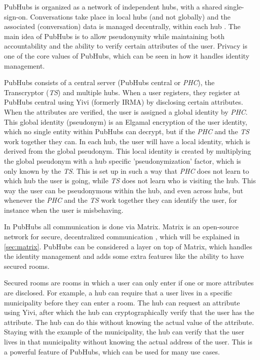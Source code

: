\documentclass{report}
\begin{document}
PubHubs is organized as a network of independent hubs, with a shared single-sign-on. Conversations take place in
local hubs (and not globally) and the associated (conversation) data is managed decentrally, within each hub
\cite{jacobs_pubhubs_2023}. The main idea of PubHubs is to allow pseudonymity while maintaining both accountability
and the ability to verify certain attributes of the user. Privacy is one of the core values of PubHubs, which can be
seen in how it handles identity management.

PubHubs consists of a central server (PubHubs central or \textit{PHC}), the Transcryptor (\textit{TS}) and multiple
hubs.
When a user registers, they register at PubHubs central using Yivi (formerly IRMA)\cite{alpar_irma_nodate} by disclosing
certain attributes. When the attributes are verified, the user is assigned a global identity by \textit{PHC}.
This global identity (pseudonym) is an Elgamal encryption of the user identity, which no single entity within PubHubs
can decrypt, but if the \textit{PHC} and the \textit{TS} work together they can. In each hub, the user will have a
local identity, which is derived from the global pseudonym. This local identity is created by multiplying the
global pseudonym with a hub specific 'pseudonymization' factor, which is only known by the \textit{TS}. This is set
up in such a way that \textit{PHC} does not learn to which hub the user is going, while \textit{TS} does not learn
who is visiting the hub. This way the user can be pseudonymous within the hub, and even across hubs, but whenever the
\textit{PHC} and the \textit{TS} work together they can identify the user, for instance when the user is misbehaving.

In PubHubs all communication is done via Matrix. Matrix is an open-source network for secure, decentralized
communication \cite{noauthor_matrixorg_nodate}, which will be explained in \autoref{sec:matrix}. PubHubs can be considered a
layer on top of Matrix, which handles the identity management and adds some extra features like the ability to have
secured rooms.

Secured rooms are rooms in which a user can only enter if one or more attributes are disclosed. For example, a hub can
require that a user lives in a specific municipality before they can enter a room. The hub can request an attribute
using Yivi, after which the hub can cryptographically verify that the user has the attribute. The hub can do this
without knowing the actual value of the attribute. Staying with the example of the municipality, the hub can
verify that the user lives in that municipality without knowing the actual address of the user. This is a powerful
feature of PubHubs, which can be used for many use cases.
\end{document}
